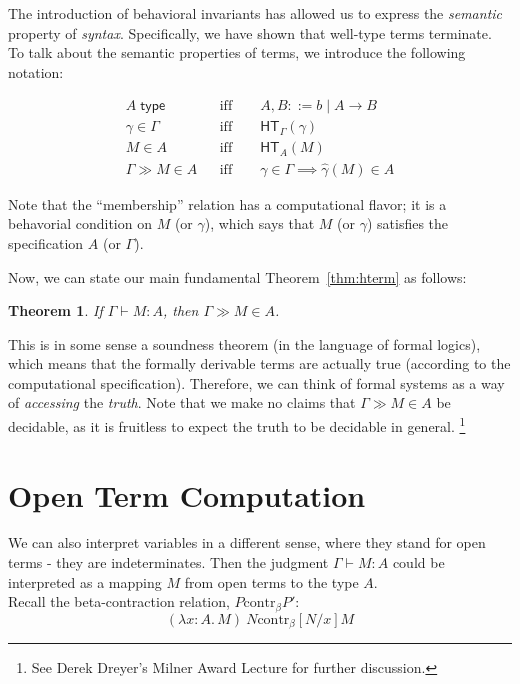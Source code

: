 \documentclass{article}
\newtheorem{thm}{Theorem}
\newcommand{\hasEF}[3]{\ensuremath{#1 \vdash #2 : #3}}
\newcommand{\hasEC}[3]{\ensuremath{#1 \gg #2 \in #3}}
\newcommand{\hterm}[2]{\ensuremath{\mathsf{HT}_{#1}(#2)}}
\newcommand{\contrb}[2]{#1 \mathrel{\text{contr}_\beta} #2}
\newcommand{\fn}[2]{\ensuremath{#1 \to #2}}
\newcommand{\ap}[2]{\ensuremath{#1\ #2}}
\newcommand{\lam}[3]{\ensuremath{\lambda #1 {:} #2.\, #3}}
\begin{document}
The introduction of behavioral invariants has allowed us to express the \emph{semantic}
property of \emph{syntax}.  Specifically, we have shown that well-type terms terminate.  To
talk about the semantic properties of terms, we introduce the following notation:

\begin{align*}
&A \; \mathsf{type} &&\text{iff}  \quad \quad A, B ::= b \mid \fn{A}{B}&\\
&\gamma \in \Gamma &&\text{iff} \quad \quad \hterm{\Gamma}{\gamma}&\\
&M \in A &&\text{iff} \quad \quad \hterm{A}{M}&\\
&\hasEC{\Gamma}{M}{A} &&\text{iff} \quad \quad \gamma \in \Gamma \implies \hat\gamma(M) \in A&
\end{align*}

Note that the ``membership'' relation has a computational flavor; it is a behavorial condition
on $M$ (or $\gamma$), which says that $M$ (or $\gamma$) satisfies the specification $A$ (or
$\Gamma$).

Now, we can state our main fundamental Theorem~\ref{thm:hterm} as follows:

\begin{thm}
If $\hasEF{\Gamma}{M}{A}$, then $\hasEC{\Gamma}{M}{A}$.
\end{thm}

This is in some sense a soundness theorem (in the language of formal logics), which means that
the formally derivable terms are actually true (according to the computational
specification). Therefore, we can think of formal systems as a way of \emph{accessing} the
\emph{truth}. Note that we make no claims that $\hasEC{\Gamma}{M}{A}$ be decidable, as it is
fruitless to expect the truth to be decidable in general. \footnote{See Derek Dreyer's Milner
  Award Lecture for further discussion.}

\section{Open Term Computation}

We can also interpret variables in a different sense, where they stand for open terms - they are indeterminates. 
Then the judgment $\hasEF{\Gamma}{M}{A}$ could be interpreted as a mapping $M$ from open terms to the type $A$.\\

Recall the beta-contraction relation, $\contrb{P}{P'}$:
\[
\contrb{\ap{(\lam{x}{A}{M})}{N}}{[N/x]M}
\]
\end{document}
